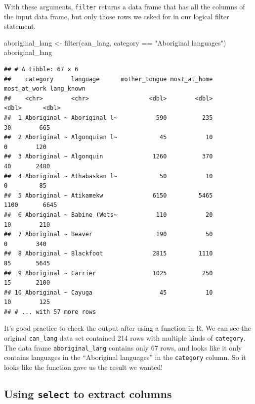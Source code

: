 \documentclass[
]{book}
\newenvironment{Shaded}{\begin{snugshade}}{\end{snugshade}}
\newcommand{\FunctionTok}[1]{\textcolor[rgb]{0,0,0}{#1}}
\newcommand{\NormalTok}[1]{#1}
\newcommand{\OtherTok}[1]{\textcolor[rgb]{0.37,0.37,0.37}{#1}}
\newcommand{\SpecialCharTok}[1]{\textcolor[rgb]{0,0,0}{#1}}
\newcommand{\StringTok}[1]{\textcolor[rgb]{0.5,0.5,0.5}{#1}}
\begin{document}
With these arguments, \texttt{filter} returns a data frame that has all the columns of
the input data frame, but only those rows we asked for in our logical filter
statement.

\begin{Shaded}
\begin{Highlighting}[]
\NormalTok{aboriginal\_lang }\OtherTok{\textless{}{-}} \FunctionTok{filter}\NormalTok{(can\_lang, category }\SpecialCharTok{==} \StringTok{"Aboriginal languages"}\NormalTok{)}
\NormalTok{aboriginal\_lang}
\end{Highlighting}
\end{Shaded}

\begin{verbatim}
## # A tibble: 67 x 6
##    category     language      mother_tongue most_at_home most_at_work lang_known
##    <chr>        <chr>                 <dbl>        <dbl>        <dbl>      <dbl>
##  1 Aboriginal ~ Aboriginal l~           590          235           30        665
##  2 Aboriginal ~ Algonquian l~            45           10            0        120
##  3 Aboriginal ~ Algonquin              1260          370           40       2480
##  4 Aboriginal ~ Athabaskan l~            50           10            0         85
##  5 Aboriginal ~ Atikamekw              6150         5465         1100       6645
##  6 Aboriginal ~ Babine (Wets~           110           20           10        210
##  7 Aboriginal ~ Beaver                  190           50            0        340
##  8 Aboriginal ~ Blackfoot              2815         1110           85       5645
##  9 Aboriginal ~ Carrier                1025          250           15       2100
## 10 Aboriginal ~ Cayuga                   45           10           10        125
## # ... with 57 more rows
\end{verbatim}

It's good practice to check the output after using a
function in R. We can see the original \texttt{can\_lang} data set contained 214 rows
with multiple kinds of \texttt{category}. The data frame
\texttt{aboriginal\_lang} contains only 67 rows, and looks like it only contains languages in
the ``Aboriginal languages'' in the \texttt{category} column. So it looks like the function
gave us the result we wanted!

\hypertarget{using-select-to-extract-columns}{%
\subsection{\texorpdfstring{Using \texttt{select} to extract columns}{Using select to extract columns}}\label{using-select-to-extract-columns}}
\end{document}
